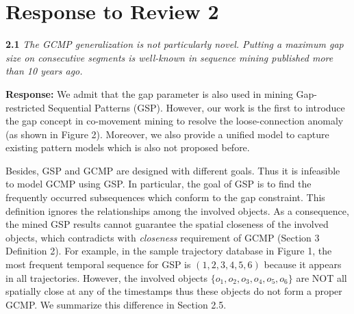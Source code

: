 \section{Response to Review 2}

\textbf{2.1} \emph{The GCMP generalization is not particularly novel. Putting a maximum gap size
on consecutive segments is well-known
in sequence mining published more than
10 years ago.}

\textbf{Response:} We admit that the gap parameter
is also used in mining Gap-restricted Sequential Patterns (GSP). 
However, our work is the first to introduce the gap concept 
in co-movement mining to resolve the
loose-connection anomaly (as shown in Figure 2).  
Moreover, we also provide
a unified model to capture existing pattern models which 
is also not proposed before.
%

%
%
%
%

Besides, GSP and GCMP are designed with different goals. Thus it is infeasible
to model GCMP using GSP. 
In particular, the goal of GSP 
is to find the frequently occurred subsequences which conform to the gap constraint.
This definition ignores the relationships among the involved objects. 
As a consequence, the mined GSP results cannot guarantee the spatial closeness of the involved
objects, which contradicts with \emph{closeness} requirement of GCMP (Section 3 Definition 2). 
For example, in the sample trajectory database in Figure 1, 
the most frequent temporal sequence for GSP is
$(1,2,3,4,5,6)$ because it appears in all trajectories. 
However, the involved objects $\{o_1,o_2,o_3,o_4,o_5,o_6\}$ are NOT all
spatially close at any of the timestamps thus these objects do not form a proper GCMP.
We summarize this difference in Section 2.5.

